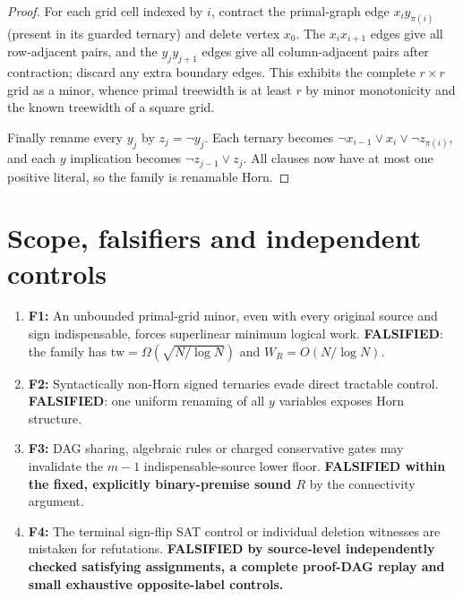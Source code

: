 \documentclass[11pt]{article}
\begin{document}
\begin{proof}
For each grid cell indexed by $i$, contract the primal-graph edge $x_i y_{\pi(i)}$ (present in its guarded ternary) and delete vertex $x_0$. The $x_i x_{i+1}$ edges give all row-adjacent pairs, and the $y_j y_{j+1}$ edges give all column-adjacent pairs after contraction; discard any extra boundary edges. This exhibits the complete $r\times r$ grid as a minor, whence primal treewidth is at least $r$ by minor monotonicity and the known treewidth of a square grid.

Finally rename every $y_j$ by $z_j=\neg y_j$. Each ternary becomes $\neg x_{i-1}\vee x_i\vee\neg z_{\pi(i)}$, and each $y$ implication becomes $\neg z_{j-1}\vee z_j$. All clauses now have at most one positive literal, so the family is renamable Horn.
\end{proof}

\section*{Scope, falsifiers and independent controls}
\begin{enumerate}
\item[] \textbf{F1:} An unbounded primal-grid minor, even with every original source and sign indispensable, forces superlinear minimum logical work. \textbf{FALSIFIED}: the family has $\mathrm{tw}=\Omega(\sqrt{N/\log N})$ and $W_R=O(N/\log N)$.
\item[] \textbf{F2:} Syntactically non-Horn signed ternaries evade direct tractable control. \textbf{FALSIFIED}: one uniform renaming of all $y$ variables exposes Horn structure.
\item[] \textbf{F3:} DAG sharing, algebraic rules or charged conservative gates may invalidate the $m-1$ indispensable-source lower floor. \textbf{FALSIFIED within the fixed, explicitly binary-premise sound $R$} by the connectivity argument.
\item[] \textbf{F4:} The terminal sign-flip SAT control or individual deletion witnesses are mistaken for refutations. \textbf{FALSIFIED by source-level independently checked satisfying assignments, a complete proof-DAG replay and small exhaustive opposite-label controls.}
\end{enumerate}
\end{document}
